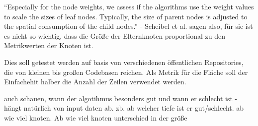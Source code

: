 \enquote{Especially for the node weights, we assess if the algorithms use the weight values to scale the sizes of leaf nodes. Typically, the size of parent nodes is adjusted to the spatial consumption of the child nodes.}\cite[3]{scheibel2020survey} - Scheibel et al. sagen also, für sie ist es nicht so wichtig, dass die Größe der Elternknoten proportional zu den Metrikwerten der Knoten ist.

Dies soll getestet werden auf basis von verschiedenen öffentlichen Repositories, die von kleinen bis großen Codebasen reichen. Als Metrik für die Fläche soll der Einfachehit halber die Anzahl der Zeilen verwendet werden.

auch schauen, wann der algotihmus besonders gut und wann er schlecht ist - hängt natürlich von input daten  ab. zb. ab welcher tiefe ist er gut/schlecht. ab wie viel knoten. Ab wie viel knoten unterschied in der größe
